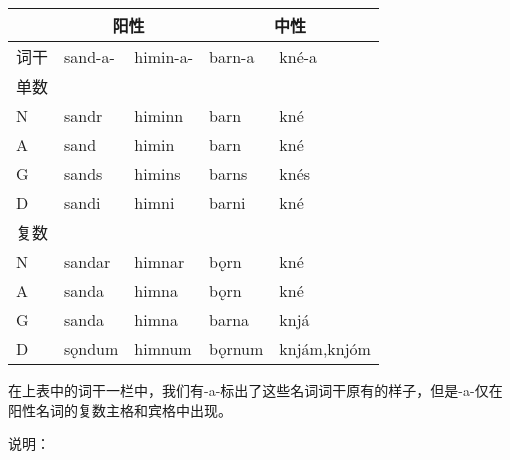 \begin{longtable}{lllll}
  \toprule
       & \multicolumn{2}{c}{阳性} & \multicolumn{2}{c}{中性}                        \\
  \midrule
  \endhead
  \bottomrule
  \endfoot
  词干 & sand-a-                  & himin-a-                 & barn-a & kné-a       \\
  单数 &                          &                          &        &             \\
  N    & sandr                    & himinn                   & barn   & kné         \\
  A    & sand                     & himin                    & barn   & kné         \\
  G    & sands                    & himins                   & barns  & knés        \\
  D    & sandi                    & himni                    & barni  & kné         \\
  复数 &                          &                          &        &             \\
  N    & sandar                   & himnar                   & bǫrn   & kné         \\
  A    & sanda                    & himna                    & bǫrn   & kné         \\
  G    & sanda                    & himna                    & barna  & knjá        \\
  D    & sǫndum                   & himnum                   & bǫrnum & knjám,knjóm \\
\end{longtable}

在上表中的词干一栏中，我们有-a-标出了这些名词词干原有的样子，但是-a-仅在阳性名词的复数主格和宾格中出现。

说明：

